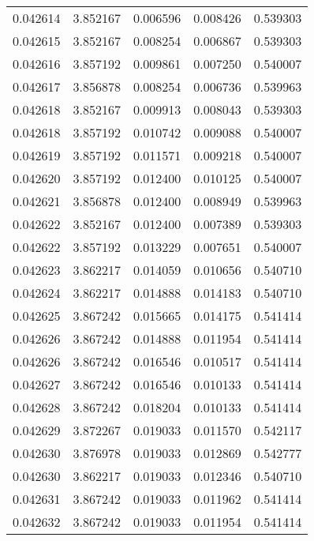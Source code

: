 \begin{tabular}{lrrrr}
0.042614    &  3.852167 &  0.006596 &  0.008426 &             0.539303 \\
0.042615    &  3.852167 &  0.008254 &  0.006867 &             0.539303 \\
0.042616    &  3.857192 &  0.009861 &  0.007250 &             0.540007 \\
0.042617    &  3.856878 &  0.008254 &  0.006736 &             0.539963 \\
0.042618    &  3.852167 &  0.009913 &  0.008043 &             0.539303 \\
0.042618    &  3.857192 &  0.010742 &  0.009088 &             0.540007 \\
0.042619    &  3.857192 &  0.011571 &  0.009218 &             0.540007 \\
0.042620    &  3.857192 &  0.012400 &  0.010125 &             0.540007 \\
0.042621    &  3.856878 &  0.012400 &  0.008949 &             0.539963 \\
0.042622    &  3.852167 &  0.012400 &  0.007389 &             0.539303 \\
0.042622    &  3.857192 &  0.013229 &  0.007651 &             0.540007 \\
0.042623    &  3.862217 &  0.014059 &  0.010656 &             0.540710 \\
0.042624    &  3.862217 &  0.014888 &  0.014183 &             0.540710 \\
0.042625    &  3.867242 &  0.015665 &  0.014175 &             0.541414 \\
0.042626    &  3.867242 &  0.014888 &  0.011954 &             0.541414 \\
0.042626    &  3.867242 &  0.016546 &  0.010517 &             0.541414 \\
0.042627    &  3.867242 &  0.016546 &  0.010133 &             0.541414 \\
0.042628    &  3.867242 &  0.018204 &  0.010133 &             0.541414 \\
0.042629    &  3.872267 &  0.019033 &  0.011570 &             0.542117 \\
0.042630    &  3.876978 &  0.019033 &  0.012869 &             0.542777 \\
0.042630    &  3.862217 &  0.019033 &  0.012346 &             0.540710 \\
0.042631    &  3.867242 &  0.019033 &  0.011962 &             0.541414 \\
0.042632    &  3.867242 &  0.019033 &  0.011954 &             0.541414 \\

\end{tabular}
